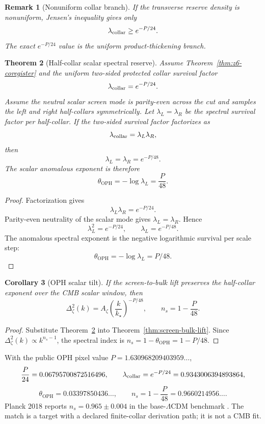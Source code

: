 \documentclass[11pt]{article}
\newtheorem{theorem}{Theorem}[section]
\newtheorem{corollary}[theorem]{Corollary}
\newtheorem{remark}[theorem]{Remark}
\newcommand{\OPH}{\mathrm{OPH}}
\newcommand{\LCDM}{\Lambda\mathrm{CDM}}
\begin{document}
\begin{remark}[Nonuniform collar branch]
If the transverse reserve density is nonuniform, Jensen's inequality gives only
\[
\lambda_{\rm collar}\ge e^{-P/24}.
\]
The exact \(e^{-P/24}\) value is the uniform product-thickening branch.
\end{remark}

\begin{theorem}[Half-collar scalar spectral reserve]\label{thm:half-collar}
Assume Theorem~\ref{thm:z6-coregister} and the uniform two-sided protected collar survival factor
\[
\lambda_{\rm collar}=e^{-P/24}.
\]
Assume the neutral scalar screen mode is parity-even across the cut and samples the left and right
half-collars symmetrically. Let \(\lambda_L=\lambda_R\) be the spectral survival factor per
half-collar. If the two-sided survival factor factorizes as
\[
\lambda_{\rm collar}=\lambda_L\lambda_R,
\]
then
\[
\lambda_L=\lambda_R=e^{-P/48}.
\]
The scalar anomalous exponent is therefore
\[
\boxed{
\theta_{\OPH}
=
-\log\lambda_L
=
\frac{P}{48}.
}
\]
\end{theorem}

\begin{proof}
Factorization gives
\[
\lambda_L\lambda_R=e^{-P/24}.
\]
Parity-even neutrality of the scalar mode gives \(\lambda_L=\lambda_R\). Hence
\[
\lambda_L^2=e^{-P/24},
\qquad
\lambda_L=e^{-P/48}.
\]
The anomalous spectral exponent is the negative logarithmic survival per scale step:
\[
\theta_{\OPH}=-\log\lambda_L=P/48.
\]
\end{proof}

\begin{corollary}[OPH scalar tilt]\label{cor:tilt}
If the screen-to-bulk lift preserves the half-collar exponent over the CMB scalar window, then
\[
\Delta_\zeta^2(k)
=
A_\zeta
\left(\frac{k}{k_\star}\right)^{-P/48},
\qquad
n_s=1-\frac{P}{48}.
\]
\end{corollary}

\begin{proof}
Substitute Theorem~\ref{thm:half-collar} into Theorem~\ref{thm:screen-bulk-lift}. Since
\(\Delta_\zeta^2(k)\propto k^{n_s-1}\), the spectral index is \(n_s=1-\theta_{\OPH}=1-P/48\).
\end{proof}

With the public OPH pixel value \(P=1.630968209403959\ldots\),
\[
\frac{P}{24}=0.06795700872516496,\qquad
\lambda_{\rm collar}=e^{-P/24}=0.9343006394893864,
\]
\[
\theta_{\OPH}=0.03397850436\ldots,\qquad
\boxed{
n_s=1-\frac{P}{48}=0.9660214956\ldots .
}
\]
Planck 2018 reports \(n_s=0.965\pm0.004\) in the base-\(\LCDM\) benchmark
\cite{planck2018}. The match is a target with a declared finite-collar derivation path; it is not a
CMB fit.
\end{document}
